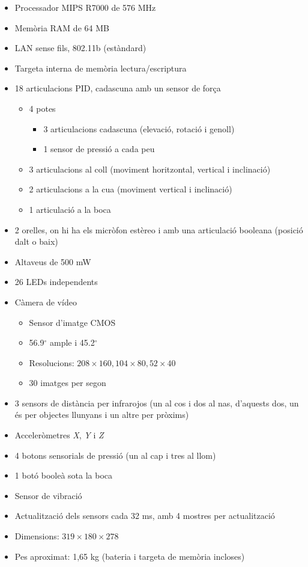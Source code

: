 \documentclass[12pt,a4paper,final,twoside]{article}
\begin{document}
\begin{itemize}
\item Processador MIPS R7000 de 576 MHz 
\item Memòria RAM de 64 MB
\item LAN sense fils, 802.11b (estàndard)
\item Targeta interna de memòria lectura/escriptura 
\item 18 articulacions PID, cadascuna amb un sensor de força
\begin{itemize}
\item 4 potes
\begin{itemize}
\item 3 articulacions cadascuna (elevació, rotació i genoll)
\item 1 sensor de pressió a cada peu
\end{itemize}
\item 3 articulacions al coll (moviment horitzontal, vertical i inclinació)
\item 2 articulacions a la cua (moviment vertical i inclinació)
\item 1 articulació a la boca
\end{itemize}
\item 2 orelles, on hi ha els micròfon estèreo i amb una articulació booleana (posició dalt o baix)
\item Altaveus de 500 mW
\item 26 LEDs independents
\item Càmera de vídeo
\begin{itemize}
\item Sensor d'imatge CMOS
\item 56.9$^{\circ}$ ample i 45.2$^{\circ}$
\item Resolucions: $208\times160, 104\times80, 52\times40$
\item 30 imatges per segon
\end{itemize}
\item 3 sensors de distància per infrarojos (un al cos i dos al nas, d'aquests dos, un és per objectes llunyans i un altre per pròxims)
\item Acceleròmetres \textit{X}, \textit{Y} i \textit{Z}
\item 4 botons sensorials de pressió (un al cap i tres al llom)
\item 1 botó booleà sota la boca
\item Sensor de vibració
\item Actualització dels sensors cada 32 ms, amb 4 mostres per actualització
\item Dimensions: $319\times180\times278$
\item Pes aproximat: 1,65 kg (bateria i targeta de memòria incloses)
\end{itemize}
\end{document}
